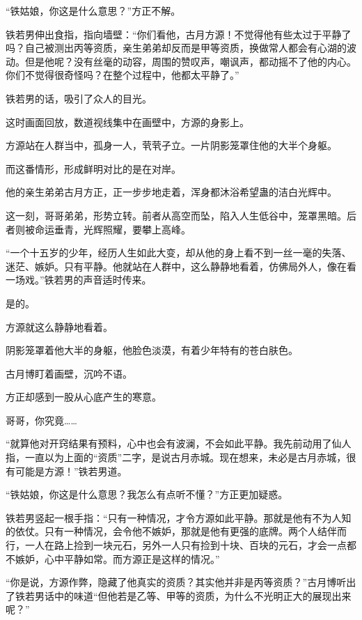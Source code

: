 
\begin{this_body}

“铁姑娘，你这是什么意思？”方正不解。

铁若男伸出食指，指向墙壁：“你们看他，古月方源！不觉得他有些太过于平静了吗？自己被测出丙等资质，亲生弟弟却反而是甲等资质，换做常人都会有心湖的波动。但是他呢？没有丝毫的动容，周围的赞叹声，嘲讽声，都动摇不了他的内心。你们不觉得很奇怪吗？在整个过程中，他都太平静了。”

铁若男的话，吸引了众人的目光。

这时画面回放，数道视线集中在画壁中，方源的身影上。

方源站在人群当中，孤身一人，茕茕孑立。一片阴影笼罩住他的大半个身躯。

而这番情形，形成鲜明对比的是在对岸。

他的亲生弟弟古月方正，正一步步地走着，浑身都沐浴希望蛊的洁白光辉中。

这一刻，哥哥弟弟，形势立转。前者从高空而坠，陷入人生低谷中，笼罩黑暗。后者则被命运垂青，光辉照耀，要攀上高峰。

“一个十五岁的少年，经历人生如此大变，却从他的身上看不到一丝一毫的失落、迷茫、嫉妒。只有平静。他就站在人群中，这么静静地看着，仿佛局外人，像在看一场戏。”铁若男的声音适时传来。

是的。

方源就这么静静地看着。

阴影笼罩着他大半的身躯，他脸色淡漠，有着少年特有的苍白肤色。

古月博盯着画壁，沉吟不语。

方正却感到一股从心底产生的寒意。

哥哥，你究竟……

“就算他对开窍结果有预料，心中也会有波澜，不会如此平静。我先前动用了仙人指，一直以为上面的“资质”二字，是说古月赤城。现在想来，未必是古月赤城，很有可能是方源！”铁若男道。

“铁姑娘，你这是什么意思？我怎么有点听不懂？”方正更加疑惑。

铁若男竖起一根手指：“只有一种情况，才令方源如此平静。那就是他有不为人知的依仗。只有一种情况，会令他不嫉妒，那就是他有更强的底牌。两个人结伴而行，一人在路上捡到一块元石，另外一人只有捡到十块、百块的元石，才会一点都不嫉妒，心中平静如常。而方源正是这样的情况。”

“你是说，方源作弊，隐藏了他真实的资质？其实他并非是丙等资质？”古月博听出了铁若男话中的味道“但他若是乙等、甲等的资质，为什么不光明正大的展现出来呢？”


\end{this_body}
